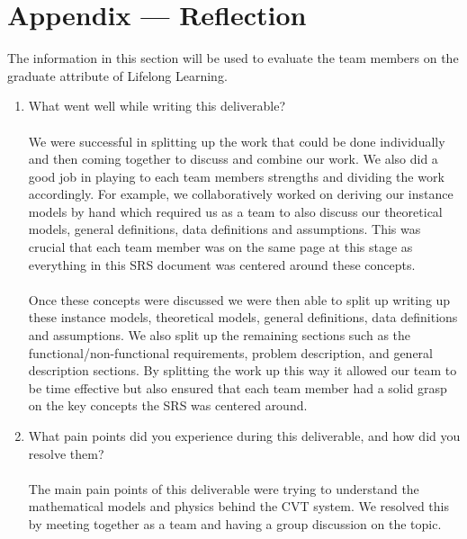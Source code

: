 \documentclass[12pt]{article}
\begin{document}
\newpage





\newpage
\section*{Appendix --- Reflection}


The information in this section will be used to evaluate the team members on the
graduate attribute of Lifelong Learning.  



\begin{enumerate}
  \item What went well while writing this deliverable?
  \\\\
  We were successful in splitting up the work that could be done individually and then coming together to discuss and combine our work.
  We also did a good job in playing to each team members strengths and dividing the work accordingly. 
  For example, we collaboratively worked on deriving our instance models by hand which required us as a team to also discuss our theoretical models, general definitions, data definitions and assumptions. 
  This was crucial that each team member was on the same page at this stage as everything in this SRS document was centered around these concepts.
  \\\\
  Once these concepts were discussed we were then able to split up writing up these instance models, theoretical models, general definitions, data definitions and assumptions. 
  We also split up the remaining sections such as the functional/non-functional requirements, problem description, and general description sections. 
  By splitting the work up this way it allowed our team to be time effective but also ensured that each team member had a solid grasp on the key concepts the SRS was centered around.  
  \item What pain points did you experience during this deliverable, and how did
  you resolve them?
  \\\\
  The main pain points of this deliverable were trying to understand the mathematical models and physics behind the CVT system.
  We resolved this by meeting together as a team and having a group discussion on the topic.

\end{enumerate}
\end{document}
